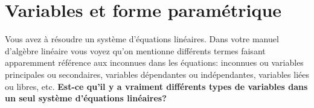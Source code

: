\chapter{Variables et forme paramétrique}

Vous avez à résoudre un système d'équations linéaires.
Dans votre manuel d'algèbre linéaire vous voyez qu'on mentionne différents termes 
faisant apparemment référence aux inconnues dans les équations: 
inconnues ou variables principales ou secondaires, variables dépendantes ou indépendantes, variables liées ou libres, etc. \textbf{Est-ce qu'il y a vraiment différents types de variables dans un seul système d'équations linéaires?}

